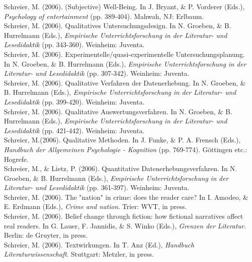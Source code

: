 Schreier, M. (2006). (Subjective) Well-Being. In J. Bryant, \& P. Vorderer (Eds.), \textit{Psychology of entertainment }(pp. 389-404). Mahwah, NJ: Erlbaum.\\
\newpage
Schreier, M. (2006). Qualitatives Untersuchungsdesign. In N. Groeben, \& B. Hurrelmann (Eds.), \textit{Empirische Unterrichtsforschung in der Literatur- und Lesedidaktik} (pp. 343-360). Weinheim: Juventa.\\

Schreier, M. (2006). Experimentelle/quasi-experimentelle Untersuchungsplanung. In N. Groeben, \& B. Hurrelmann (Eds.), \textit{Empirische Unterrichtsforschung in der Literatur- und Lesedidaktik }(pp. 307-342). Weinheim: Juventa.\\

Schreier, M. (2006). Qualitative Verfahren der Datenerhebung. In N. Groeben, \& B. Hurrelmann (Eds.), \textit{Empirische Unterrichtsforschung in der Literatur- und Lesedidaktik }(pp. 399-420). Weinheim: Juventa.\\

Schreier, M. (2006). Qualitative Auswertungsverfahren. In N. Groeben, \& B. Hurrelmann (Eds.), \textit{Empirische Unterrichtsforschung in der Literatur- und Lesedidaktik }(pp. 421-442). Weinheim: Juventa.\\

Schreier, M.(2006). Qualitative Methoden. In J. Funke, \& P. A. Frensch (Eds.), \textit{Handbuch der Allgemeinen Psychologie - Kognition }(pp. 769-774). G\"{o}ttingen etc.: Hogrefe.\\

Schreier, M., \& Lietz, P. (2006). Quantitative Datenerhebungsverfahren. In N. Groeben, \& B. Hurrelmann (Eds.), \textit{Empirische Unterrichtsforschung in der Literatur- und Lesedidaktik }(pp. 361-397). Weinheim: Juventa.\\



Schreier, M. (2006). The "nation" in crime: does the reader care? In I. Amodeo, \& E. Erdmann (Eds.), \textit{Crime and nation}. Trier: WVT, in press.\\

Schreier, M. (2006). Belief change through fiction: how fictional narratives affect real readers. In G. Lauer, F. Jannidis, \& S. Winko (Eds.), \textit{Grenzen der Literatur}. Berlin: de Gruyter, in press.\\

Schreier, M. (2006). Textwirkungen. In T. Anz (Ed.), \textit{Handbuch Literaturwissenschaft}. Stuttgart: Metzler, in press.\\

